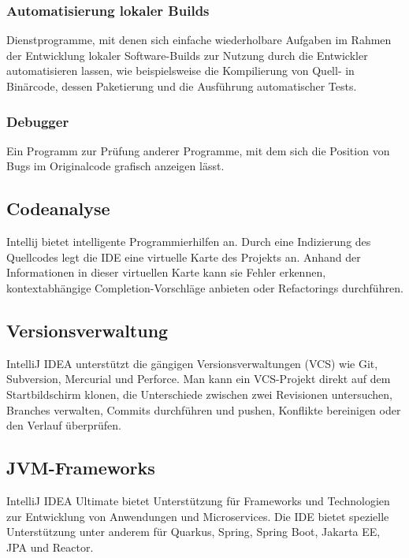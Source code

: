 \subsubsection{Automatisierung lokaler Builds}
Dienstprogramme, mit denen sich einfache wiederholbare Aufgaben im Rahmen der Entwicklung lokaler Software-Builds zur Nutzung durch 
die Entwickler automatisieren lassen, wie beispielsweise die Kompilierung von Quell- in Binärcode, dessen Paketierung und die Ausführung automatischer Tests.
\cite{sysarch-intellij-2}

\subsubsection{Debugger}
Ein Programm zur Prüfung anderer Programme, mit dem sich die Position von Bugs im Originalcode grafisch anzeigen lässt.
\cite{sysarch-intellij-2}


\subsection{Codeanalyse}

Intellij bietet intelligente Programmierhilfen an. Durch eine Indizierung des Quellcodes legt die IDE eine virtuelle 
Karte des Projekts an. Anhand der Informationen in dieser virtuellen Karte kann sie Fehler erkennen, kontextabhängige Completion-Vorschläge anbieten oder
Refactorings durchführen.
\cite{sysarch-intellij-1}


\subsection{Versionsverwaltung}

IntelliJ IDEA unterstützt die gängigen Versionsverwaltungen (VCS) wie Git, Subversion, Mercurial und Perforce. 
Man kann ein VCS-Projekt direkt auf dem Startbildschirm klonen, die Unterschiede zwischen zwei Revisionen untersuchen, Branches verwalten, 
Commits durchführen und pushen, Konflikte bereinigen oder den Verlauf überprüfen. 
\cite{sysarch-intellij-1}


\subsection{JVM-Frameworks}

IntelliJ IDEA Ultimate bietet Unterstützung für Frameworks und Technologien zur Entwicklung von Anwendungen und Microservices. 
Die IDE bietet spezielle Unterstützung unter anderem für Quarkus, Spring, Spring Boot, Jakarta EE, JPA und Reactor.
\cite{sysarch-intellij-1}


